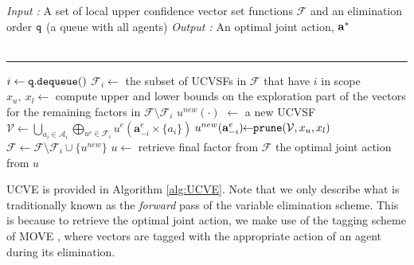 \documentclass{article}
\begin{document}
\begin{algorithm}[h]
\textit{Input :} A set of local upper confidence vector set functions $\mathcal{F}$ and an elimination order $\tt q$ (a queue with all agents)\newline
 \textit {Output :} An optimal joint action, $\bf a^*$\\\
 \vspace{-2mm}
\hrule
\vspace{2mm}
\begin{algorithmic}[1]
	\STATE $i \leftarrow {\tt q.dequeue}() $
	\STATE $\mathcal{F}_i \leftarrow$ the subset of UCVSFs in $\mathcal{F}$ that have $i$ in scope
	\STATE $x_u,~x_l \leftarrow$ compute upper and lower bounds on the exploration part of the vectors for the remaining factors in $\mathcal{F}\setminus \mathcal{F}_i$
	\STATE $u^{new}(\cdot)$ $\leftarrow$ a new UCVSF\label{ln:fny}
	\FORALL{$~~~~\mathbf{a}^e_{-i} \in \mathcal{A}_{D^e \setminus \{i\}}~~~~$}
		\STATE $\displaystyle\mathcal{V} \leftarrow \bigcup_{a_i\in\mathcal{A}_i} \bigoplus_{u^e\in \mathcal{F}_i} u^e(\mathbf{a}^e_{-i} \times \{a_i\})$
		\STATE $\!u^{new}({\bf a}^e_{-i})\!\!\leftarrow\!\!{\tt prune}(\mathcal{V},  x_u, x_l)$ \label{ln:themagic}
	\ENDFOR
	\STATE $ \mathcal{F} \leftarrow \mathcal{F} \setminus \mathcal{F}_i \cup \{ u^{new} \} $
\ENDWHILE \label{ln:elim}
\STATE $ u \leftarrow$ retrieve final factor from $\mathcal{F} $ \label{ln:retr}
\STATE {\bf return} {the optimal joint action from $u$}
\end{algorithmic}
\caption{$\mathtt{UCVE}(\mathcal{\mathcal{F}})$}
\label{alg:UCVE}
\end{algorithm}

UCVE is provided in Algorithm \ref{alg:UCVE}. Note that we only describe what is traditionally known
as the \emph{forward} pass of the variable elimination scheme. This is because to retrieve the
optimal joint action, we make use of the tagging scheme of MOVE \cite{roijers2015computing}, where
vectors are tagged with the appropriate action of an agent during its elimination. %
\end{document}
